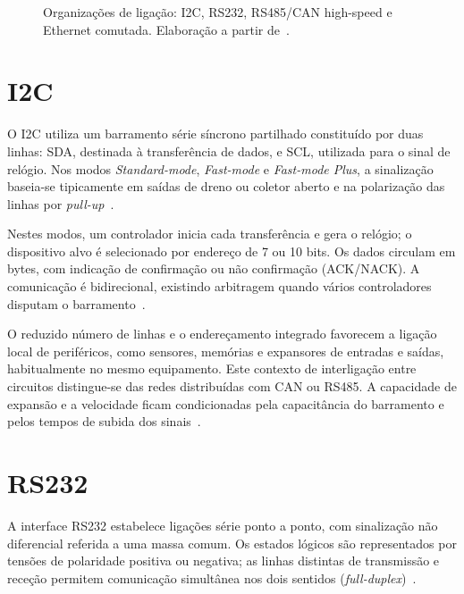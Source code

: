 \begin{figure}[htbp]
    \centering
    \caption[Topologias das interfaces de comunicação.]{Organizações de ligação: I2C, RS232, RS485/CAN high-speed e Ethernet comutada. Elaboração a partir de~\cite{nxp_um10204_2021,dodson_rs232_2023,ti_rs485_an1057_2013,cia_can_hs,simmons_ethernet_2008}.}
    \label{fig:topologias}
\end{figure}

\section{I2C}

O I2C utiliza um barramento série síncrono partilhado constituído por duas
linhas: SDA, destinada à transferência de dados, e SCL, utilizada para o
sinal de relógio. Nos modos \textit{Standard-mode}, \textit{Fast-mode} e
\textit{Fast-mode Plus}, a sinalização baseia-se tipicamente em saídas de dreno ou
coletor aberto e na polarização das linhas por
\textit{pull-up}~\cite[sec.~3.1]{nxp_um10204_2021}.

Nestes modos, um controlador inicia cada transferência e gera o relógio;
o dispositivo alvo é selecionado por endereço de 7 ou 10 bits. Os dados circulam em bytes,
com indicação de confirmação ou não confirmação (ACK/NACK). A comunicação
é bidirecional, existindo arbitragem quando vários controladores disputam
o barramento~\cite[secs.~3.1.5--3.1.11]{nxp_um10204_2021}.

O reduzido número de linhas e o endereçamento integrado favorecem a
ligação local de periféricos, como sensores, memórias e expansores de
entradas e saídas, habitualmente no mesmo equipamento. Este contexto de
interligação entre circuitos distingue-se das redes distribuídas com
CAN ou RS485. A capacidade de expansão e a velocidade ficam condicionadas
pela capacitância do barramento e pelos tempos de subida dos
sinais~\cite[secs.~2 e~7]{nxp_um10204_2021}.

\section{RS232}

A interface RS232 estabelece ligações série ponto a ponto, com sinalização
não diferencial referida a uma massa comum. Os estados lógicos são
representados por tensões de polaridade positiva ou negativa; as linhas
distintas de transmissão e receção permitem comunicação simultânea nos
dois sentidos (\textit{full-duplex})~\cite[secs.~2.1 e~2.2]{dodson_rs232_2023}.

